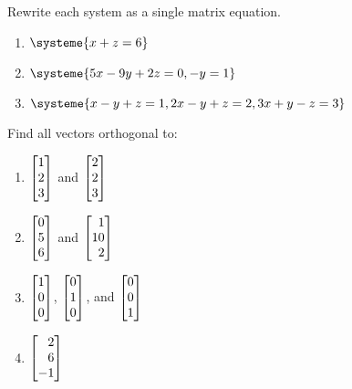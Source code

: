 \begin{exercises}
	\begin{problist}

		\prob Rewrite each system as a single matrix equation.
		\begin{enumerate}
			\item $\systeme{
											x+z=6
										}$
			\item $\systeme{
											5x-9y+2z=0,
											-y=1
										}$
			\item $\systeme{
											x-y+z=1,
											2x-y+z=2,
											3x+y-z=3
										}$
		\end{enumerate}

		\prob Find all vectors orthogonal to:
		\begin{enumerate}
			\item $\mat{1\\2\\3}$ and $\mat{2\\2\\3}$
			\item $\mat{0\\5\\6}$ and $\mat{1\\10\\2}$
			\item $\mat{1\\0\\0}$, $\mat{0\\1\\0}$, and $\mat{0\\0\\1}$
			\item $\mat{2\\6\\-1}$
		\end{enumerate}


\end{problist}
\end{exercises}
